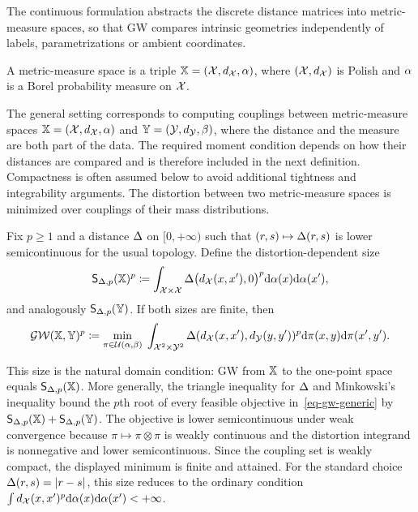 The continuous formulation abstracts the discrete distance matrices into metric-measure spaces, so that GW compares intrinsic geometries independently of labels, parametrizations or ambient coordinates.
\begin{defn}\label{def-metric-measure-space}
	A metric-measure space is a triple
	$\mathbb{X}=(\mathcal{X},d_{\mathcal{X}},\alpha)$,
	where $(\mathcal{X},d_{\mathcal{X}})$ is Polish and $\alpha$ is a Borel probability measure on $\mathcal{X}$.
\end{defn}
The general setting corresponds to computing couplings between metric-measure spaces $\mathbb{X}=(\mathcal{X},d_{\mathcal{X}},\alpha)$ and $\mathbb{Y}=(\mathcal{Y},d_{\mathcal{Y}},\beta)$, where the distance and the measure are both part of the data. The required moment condition depends on how their distances are compared and is therefore included in the next definition. Compactness is often assumed below to avoid additional tightness and integrability arguments.
%
The distortion between two metric-measure spaces is minimized over couplings of their mass distributions.
\begin{defn}\label{def-gromov-wasserstein}
		Fix $p\geq1$ and a distance $\Delta$ on $[0,+\infty)$ such that $(r,s)\mapsto\Delta(r,s)$ is lower semicontinuous for the usual topology. Define the distortion-dependent size
		\[
			\mathsf S_{\Delta,p}(\mathbb{X})^p
			\coloneqq
			\int_{\mathcal{X}\times\mathcal{X}}
			\Delta\bigl(d_{\mathcal{X}}(x,x'),0\bigr)^p
			\mathrm{d}\alpha(x)\mathrm{d}\alpha(x'),
		\]
		and analogously $\mathsf S_{\Delta,p}(\mathbb{Y})$. If both sizes are finite, then
		\begin{align}
		\label{eq-gw-generic}
		\operatorname{\mathcal{GW}}( \mathbb{X},\mathbb{Y} )^p \coloneqq
		\underset{ \pi \in \mathcal{U}(\alpha,\beta) }{\min}\;
		\int_{\mathcal{X}^2 \times \mathcal{Y}^2}
		 \Delta(d_{\mathcal{X}}(x,x'),d_{\mathcal{Y}}(y,y'))^p
			 \mathrm{d}\pi(x,y)\mathrm{d}\pi(x',y').
		\end{align}
\end{defn}
This size is the natural domain condition: GW from $\mathbb{X}$ to the one-point space equals $\mathsf S_{\Delta,p}(\mathbb{X})$. More generally, the triangle inequality for $\Delta$ and Minkowski's inequality bound the $p$th root of every feasible objective in~\eqref{eq-gw-generic} by $\mathsf S_{\Delta,p}(\mathbb{X})+\mathsf S_{\Delta,p}(\mathbb{Y})$. The objective is lower semicontinuous under weak convergence because $\pi\mapsto\pi\otimes\pi$ is weakly continuous and the distortion integrand is nonnegative and lower semicontinuous. Since the coupling set is weakly compact, the displayed minimum is finite and attained. For the standard choice $\Delta(r,s)=|r-s|$, this size reduces to the ordinary condition $\int d_{\mathcal{X}}(x,x')^p\mathrm{d}\alpha(x)\mathrm{d}\alpha(x')<+\infty$.
